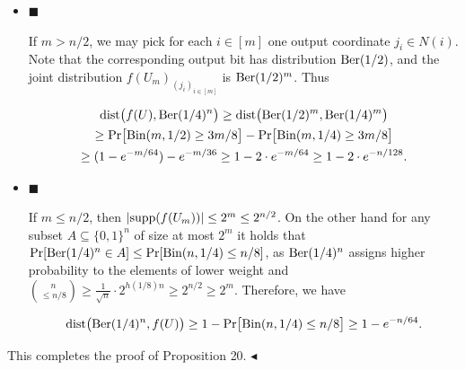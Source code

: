\documentclass[10pt,a4paper]{article}
\begin{document}
\begin{itemize}


\item[] 
$\blacksquare$ 


If $m>n/2$, we may pick for each $i\in[m]$ one output coordinate $j_{i}\in N(i)$. Note that the corresponding output bit has distribution $\textnormal{Ber}(1/2)$, and the joint distribution $f(U_{m})_{(j_{i})_{i\in[m]}}$ is $\textnormal{Ber}(1/2)^{m}$. Thus\par


\[\begin{gathered}
\displaystyle\mathrm{dist}\bigl(f(U),\textnormal{Ber}(1/4)^{n}\bigr) \displaystyle\geq\mathrm{dist}\bigl(\textnormal{Ber}(1/2)^{m},\textnormal{Ber}(1/4)^{m}\bigr) \\
\displaystyle\geq\Pr\bigl[\textnormal{Bin}(m,1/2)\geq 3m/8\bigr]-\Pr\bigl[\textnormal{Bin}(m,1/4)\geq 3m/8\bigr] \\
\displaystyle\geq(1-e^{-m/64})-e^{-m/36}\geq 1-2\cdot e^{-m/64}\geq 1-2\cdot e^{-n/128}.
\end{gathered}\]





\item[] 
$\blacksquare$ 


If $m\leq n/2$, then $\lvert{\rm supp}(f(U_{m}))\rvert\leq 2^{m}\leq 2^{n/2}$.
On the other hand for any subset $A\subseteq\{0,1\}^{n}$ of size at most $2^{m}$ it holds that
$\Pr[\textnormal{Ber}(1/4)^{n}\in A]\leq\Pr[\textnormal{Bin}(n,1/4)\leq n/8]$, as $\textnormal{Ber}(1/4)^{n}$ assigns higher probability to the elements of lower weight and $\binom{n}{\leq n/8}\geq\frac{1}{\sqrt{n}}\cdot 2^{h(1/8)n}\geq 2^{n/2}\geq 2^{m}$.
Therefore, we have\par


\[\begin{gathered}
\mathrm{dist}\bigl(\textnormal{Ber}(1/4)^{n},f(U)\bigr)\geq 1-\Pr\bigl[\textnormal{Bin}(n,1/4)\leq n/8\bigr]\geq 1-e^{-n/64}.
\end{gathered}\]





\end{itemize}


This completes the proof of Proposition 20.
$\blacktriangleleft$\par



\end{document}
